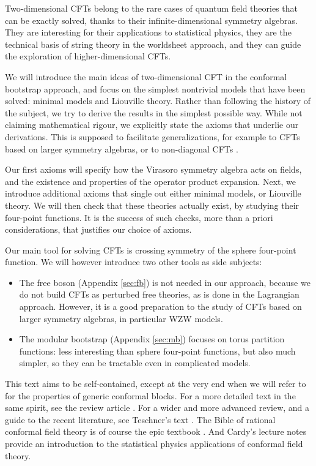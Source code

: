 \documentclass[12pt, a4paper]{article}
\theoremstyle{break}
\begin{document}
Two-dimensional CFTs belong to the rare cases of quantum field theories that can be exactly solved, thanks to their infinite-dimensional symmetry algebras. They are interesting for their applications to statistical physics, they are the technical basis of string theory in the worldsheet approach, and they can guide the exploration of higher-dimensional CFTs. 

We will introduce the main ideas of two-dimensional CFT in the conformal bootstrap approach, and focus on the simplest nontrivial models that have been solved: minimal models and Liouville theory. Rather than following the history of the subject, we try to derive the results in the simplest possible way. 
While not claiming mathematical rigour, we explicitly state the axioms that underlie our derivations.
This is supposed to facilitate generalizations, for example to CFTs based on larger symmetry algebras, or to non-diagonal CFTs \cite{mr17}.

Our first axioms will specify how the Virasoro symmetry algebra acts on fields, and the existence and properties of the operator product expansion. 
Next, we introduce additional axioms that single out either minimal models, or Liouville theory.
We will then check that these theories actually exist, by studying their four-point functions.
It is the success of such checks, more than a priori considerations, that justifies our choice of axioms. 

Our main tool for solving CFTs is crossing symmetry of the sphere four-point function. We will however introduce two other tools as side subjects:
\begin{itemize}
 \item The free boson (Appendix \ref{sec:fb}) is not needed in our approach, because we do not build CFTs as perturbed free theories, as is done in the Lagrangian approach. However, it is a good preparation to the study of CFTs based on larger symmetry algebras, in particular WZW models. 
 \item The modular bootstrap (Appendix \ref{sec:mb}) focuses on torus partition functions: less interesting than sphere four-point functions, but also much simpler, so they can be tractable even in complicated models. 
\end{itemize}
This text  aims to be self-contained, except at the very end when we will refer to \cite{zz90} for the properties of generic conformal blocks.
For a more detailed text in the same spirit, see the review article \cite{rib14}. For a wider and more advanced review, and a guide to the recent literature, see Teschner's text \cite{tes17}. 
The Bible of rational conformal field theory is of course the epic textbook \cite{fms97}. And Cardy's lecture notes \cite{car08} provide an introduction to the statistical physics applications of conformal field theory.
\end{document}
